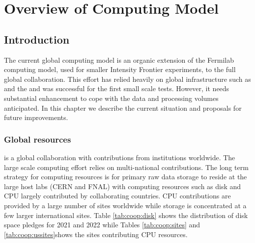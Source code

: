 \documentclass[../main-v1.tex]{subfiles}
\begin{document}
\chapter{Overview of Computing Model }
\label{ch:cm}

\section{Introduction }\label{ch:cm:intro} %






The current  global computing model is an organic extension of the Fermilab  computing model, used for smaller Intensity Frontier experiments, to the full global collaboration.  This effort  has relied heavily on global infrastructure such as  and the  and was successful for the first small scale  tests. However, it needs substantial enhancement to cope with the data and processing volumes anticipated.  In this chapter we describe the current situation and proposals for future improvements. 

\subsection{Global resources}

 is a global collaboration with contributions from institutions worldwide.  The large scale computing effort relies on multi-national contributions. The long term strategy for computing resources is for primary raw data storage to reside at the large host labs (CERN and FNAL) with computing resources such as disk and CPU largely contributed by collaborating countries.   CPU contributions are provided by a large number of sites worldwide while storage is concentrated at a few larger international sites. Table \ref{tab:coop:disk} shows the distribution of disk space pledges for 2021 and 2022 while Tables \ref{tab:coop:sites} and \ref{tab:coop:ussites}shows the sites contributing CPU resources. 



\end{document}
